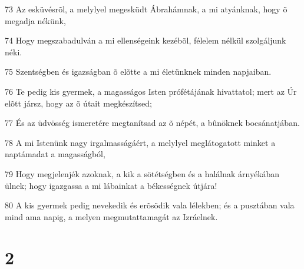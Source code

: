 \par 73 Az esküvésrõl, a melylyel megesküdt Ábrahámnak, a mi atyánknak, hogy õ megadja nékünk,
\par 74 Hogy megszabadulván a mi ellenségeink kezébõl, félelem nélkül szolgáljunk néki.
\par 75 Szentségben és igazságban õ elõtte a mi életünknek minden napjaiban.
\par 76 Te pedig kis gyermek, a magasságos Isten prófétájának hivattatol; mert az Úr elõtt jársz, hogy az õ útait megkészítsed;
\par 77 És az üdvösség ismeretére megtanítsad az õ népét, a bûnöknek bocsánatjában.
\par 78 A mi Istenünk nagy irgalmasságáért, a melylyel meglátogatott minket a naptámadat a magasságból,
\par 79 Hogy megjelenjék azoknak, a kik a sötétségben és a halálnak árnyékában ülnek; hogy igazgassa a mi lábainkat a békességnek útjára!
\par 80 A kis gyermek pedig nevekedik és erõsödik vala lélekben; és a pusztában vala mind ama napig, a melyen megmutattamagát az Izráelnek.

\chapter{2}

